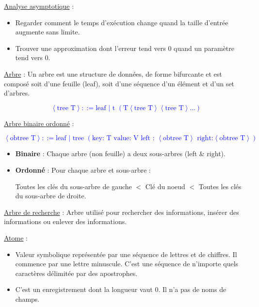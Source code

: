 \documentclass[fr,license=none]{../../../eplsummary}
\begin{document}
\begin{flushleft}
\textcolor{mauvedef}{\underline{Analyse asymptotique}} : 

\begin{itemize}
\item Regarder comment le temps d'exécution change quand la taille d'entrée augmente sans limite.
\item Trouver une approximation dont l'erreur tend vers 0 quand un paramètre tend vers 0.
\end{itemize} \bigbreak


\textcolor{mauvedef}{\underline{Arbre}} : Un arbre est une structure de données, de forme bifurcante et est composé soit d'une feuille (leaf), soit d'une séquence d'un élément et d'un set d'arbres.


\textcolor{blue}{$$\left\langle \text{tree T} \right\rangle ::= \text{leaf | t }(\text{T} \left\langle \text{tree T} \right\rangle   \left\langle \text{tree T} \right\rangle \ldots )$$} 


\textcolor{mauvedef}{\underline{Arbre binaire ordonné}} : 

\textcolor{blue}{$$\left\langle \text{obtree T} \right\rangle ::= \text{leaf | tree }(\text{key: T   value: V  left : } \left\langle  \text{obtree T} \right\rangle  \text{ right:} \left\langle \text{obtree T} \right\rangle )$$} 

\begin{itemize}
\item \textbf{Binaire} : Chaque arbre (non feuille) a deux sous-arbres (left \& right).
\item \textbf{Ordonné} : Pour chaque arbre et sous-arbre :

Toutes les clés du sous-arbre de gauche $<$ Clé du noeud $<$ Toutes les clés du sous-arbre de droite.
\end{itemize} \bigbreak


\textcolor{mauvedef}{\underline{Arbre de recherche}} : Arbre utilisé pour rechercher des informations, insérer des informations ou enlever des informations. \bigbreak

\textcolor{mauvedef}{\underline{Atome}} :

\begin{itemize}
\item Valeur symbolique représentée par une séquence de lettres et de chiffres. Il commence par une lettre minuscule. C'est une séquence de n'importe quels caractères délimitée par des apostrophes.
\item C'est un enregistrement dont la longueur vaut 0. Il n'a pas de noms de champs.
\end{itemize} \bigbreak



\end{flushleft}
\end{document}
